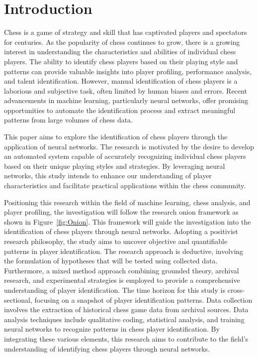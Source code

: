 \setlength{\columnsep}{1cm}
\section{Introduction}
\begin{spacing}{2.0}

Chess is a game of strategy and skill that has captivated players and spectators for centuries. As the popularity of chess continues to grow, there is a growing interest in understanding the characteristics and abilities of individual chess players. The ability to identify chess players based on their playing style and patterns can provide valuable insights into player profiling, performance analysis, and talent identification. However, manual identification of chess players is a laborious and subjective task, often limited by human biases and errors. Recent advancements in machine learning, particularly neural networks, offer promising opportunities to automate the identification process and extract meaningful patterns from large volumes of chess data.

This paper aims to explore the identification of chess players through the application of neural networks. The research is motivated by the desire to develop an automated system capable of accurately recognizing individual chess players based on their unique playing styles and strategies. By leveraging neural networks, this study intends to enhance our understanding of player characteristics and facilitate practical applications within the chess community.

Positioning this research within the field of machine learning, chess analysis, and player profiling, the investigation will follow the research onion framework as shown in Figure~\ref{fig:Onion}. This framework will guide the investigation into the identification of chess players through neural networks. Adopting a positivist research philosophy, the study aims to uncover objective and quantifiable patterns in player identification. The research approach is deductive, involving the formulation of hypotheses that will be tested using collected data. Furthermore, a mixed method approach combining grounded theory, archival research, and experimental strategies is employed to provide a comprehensive understanding of player identification. The time horizon for this study is cross-sectional, focusing on a snapshot of player identification patterns. Data collection involves the extraction of historical chess game data from archival sources. Data analysis techniques include qualitative coding, statistical analysis, and training neural networks to recognize patterns in chess player identification. By integrating these various elements, this research aims to contribute to the field's understanding of identifying chess players through neural networks.


\end{spacing}
